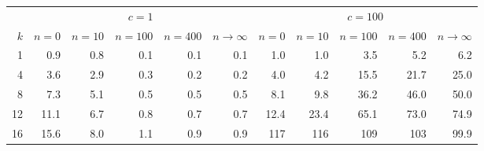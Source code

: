 \begingroup
\fontsize{9}{11}\selectfont
\setlength{\tabcolsep}{4.5pt}
\renewcommand{\arraystretch}{1.08}
\begin{tabular}{@{}rrrrrrrrrrr@{}}
\toprule
& \multicolumn{5}{c}{$c=1$} & \multicolumn{5}{c}{$c=100$} \\
\cmidrule(lr){2-6}\cmidrule(lr){7-11}
$k$ & $n=0$ & $n=10$ & $n=100$ & $n=400$ & $n\to\infty$
& $n=0$ & $n=10$ & $n=100$ & $n=400$ & $n\to\infty$ \\
\midrule
1  & 0.9  & 0.8 & 0.1 & 0.1 & 0.1 & 1.0  & 1.0  & 3.5  & 5.2  & 6.2 \\
4  & 3.6  & 2.9 & 0.3 & 0.2 & 0.2 & 4.0  & 4.2  & 15.5 & 21.7 & 25.0 \\
8  & 7.3  & 5.1 & 0.5 & 0.5 & 0.5 & 8.1  & 9.8  & 36.2 & 46.0 & 50.0 \\
12 & 11.1 & 6.7 & 0.8 & 0.7 & 0.7 & 12.4 & 23.4 & 65.1 & 73.0 & 74.9 \\
16 & 15.6 & 8.0 & 1.1 & 0.9 & 0.9 & 117  & 116  & 109  & 103  & 99.9 \\
\bottomrule
\end{tabular}
\endgroup
